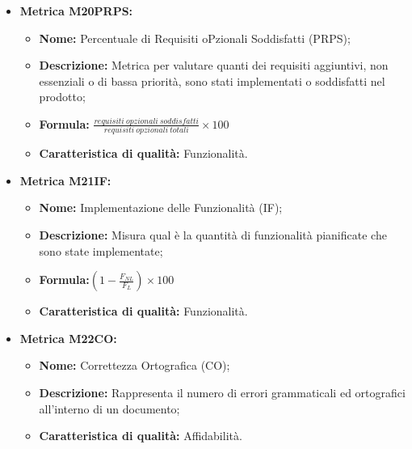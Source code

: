 \begin{itemize}
    \vspace{0.4cm}
    \item \hypertarget{item:M20PRPS}{\textbf{Metrica M20PRPS:}}
    \vspace{0.2cm}
    
    \begin{minipage}[H]{0.9\textwidth}
        \begin{itemize}
            \item \textbf{Nome:} Percentuale di Requisiti oPzionali Soddisfatti (PRPS);
            \item \textbf{Descrizione:} Metrica per valutare quanti dei requisiti aggiuntivi, non essenziali o di bassa priorità, sono stati implementati o soddisfatti nel prodotto;
            \item \textbf{Formula:} $\frac{requisiti \ opzionali \ soddisfatti}{requisiti \ opzionali \ totali}\times 100$
            \item \textbf{Caratteristica di qualità:} Funzionalità.
        \end{itemize}
    \end{minipage}

    \vspace{0.4cm}
    \item \hypertarget{item:M21IF}{\textbf{Metrica M21IF:}}
    \vspace{0.2cm}

    \begin{minipage}[H]{0.9\textwidth}
        \begin{itemize}
            \item \textbf{Nome:} Implementazione delle Funzionalità (IF);
            \item \textbf{Descrizione:} Misura qual è la quantità di funzionalità pianificate che sono state implementate;
            \item \textbf{Formula:}$(1 - \frac{F_{NL}}{F_L}) \times 100$
            \item \textbf{Caratteristica di qualità:} Funzionalità.
        \end{itemize}
    \end{minipage}

    \vspace{0.4cm}
    \item \hypertarget{item:M22CO}{\textbf{Metrica M22CO:}}
    \vspace{0.2cm}
    
        \begin{itemize}
            \item \textbf{Nome:} Correttezza Ortografica (CO);
            \item \textbf{Descrizione:} Rappresenta il numero di errori grammaticali ed ortografici all'interno di un documento;
            \item \textbf{Caratteristica di qualità:} Affidabilità.
        \end{itemize}


\end{itemize}
